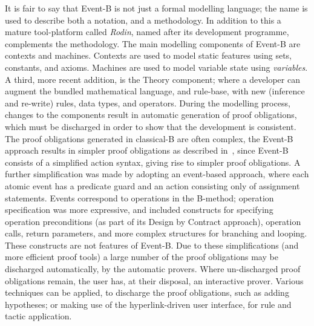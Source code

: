 It is fair to say that Event-B is not just a formal modelling language; the name is used to describe both a notation, and a methodology. In addition to this a mature tool-platform called \emph{Rodin}, named after its development programme, complements the methodology. The main modelling components of Event-B are contexts and machines. Contexts are used to model static features using sets, constants, and axioms. Machines are used to model variable state using \emph{variables}. A third, more recent addition, is the Theory component; where a developer can augment the bundled mathematical language, and rule-base, with new (inference and re-write) rules, data types, and operators. During the modelling process, changes to the components result in automatic generation of proof obligations, which must be discharged in order to show that the development is consistent. The proof obligations generated in classical-B are often complex, the Event-B approach results in simpler proof obligations as described in~\cite{Hallerstede07}, since Event-B consists of a simplified action syntax, giving rise to simpler proof obligations. A further simplification was made by adopting an event-based approach, where each atomic event has a predicate guard and an action consisting only of assignment statements. Events correspond to operations in the B-method; operation specification was more expressive, and included constructs for specifying operation preconditions (as part of its Design by Contract approach), operation calls, return parameters, and more complex structures for branching and looping. These constructs are not features of Event-B. Due to these simplifications (and more efficient proof tools) a large number of the proof obligations may be discharged automatically, by the automatic provers. Where un-discharged proof obligations remain, the user has, at their disposal, an interactive prover. Various techniques can be applied, to discharge the proof obligations, such as adding hypotheses; or making use of the hyperlink-driven user interface, for rule and tactic application. 

